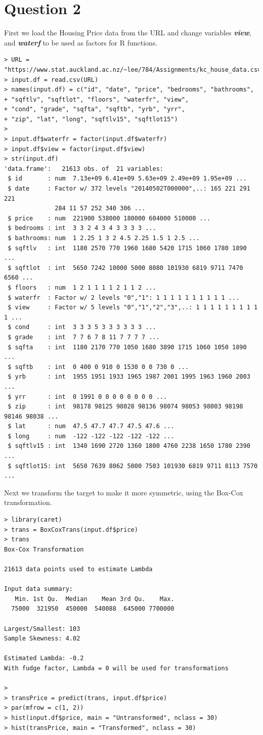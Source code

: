 \documentclass{article}%
\begin{document}
\section{Question 2}
First we load the Housing Price data from the URL and change variables \emph{\textbf{view}}, and \emph{\textbf{waterf}} to be used as factors for R functions.
\begin{verbatim}
> URL = "https://www.stat.auckland.ac.nz/~lee/784/Assignments/kc_house_data.csv"
> input.df = read.csv(URL)
> names(input.df) = c("id", "date", "price", "bedrooms", "bathrooms",
+ "sqftlv", "sqftlot", "floors", "waterfr", "view",
+ "cond", "grade", "sqfta", "sqftb", "yrb", "yrr",
+ "zip", "lat", "long", "sqftlv15", "sqftlot15")
>
> input.df$waterfr = factor(input.df$waterfr)
> input.df$view = factor(input.df$view)
> str(input.df)
'data.frame':   21613 obs. of  21 variables:
 $ id       : num  7.13e+09 6.41e+09 5.63e+09 2.49e+09 1.95e+09 ...
 $ date     : Factor w/ 372 levels "20140502T000000",..: 165 221 291 221
              284 11 57 252 340 306 ...
 $ price    : num  221900 538000 180000 604000 510000 ...
 $ bedrooms : int  3 3 2 4 3 4 3 3 3 3 ...
 $ bathrooms: num  1 2.25 1 3 2 4.5 2.25 1.5 1 2.5 ...
 $ sqftlv   : int  1180 2570 770 1960 1680 5420 1715 1060 1780 1890 ...
 $ sqftlot  : int  5650 7242 10000 5000 8080 101930 6819 9711 7470 6560 ...
 $ floors   : num  1 2 1 1 1 1 2 1 1 2 ...
 $ waterfr  : Factor w/ 2 levels "0","1": 1 1 1 1 1 1 1 1 1 1 ...
 $ view     : Factor w/ 5 levels "0","1","2","3",..: 1 1 1 1 1 1 1 1 1 1 ...
 $ cond     : int  3 3 3 5 3 3 3 3 3 3 ...
 $ grade    : int  7 7 6 7 8 11 7 7 7 7 ...
 $ sqfta    : int  1180 2170 770 1050 1680 3890 1715 1060 1050 1890 ...
 $ sqftb    : int  0 400 0 910 0 1530 0 0 730 0 ...
 $ yrb      : int  1955 1951 1933 1965 1987 2001 1995 1963 1960 2003 ...
 $ yrr      : int  0 1991 0 0 0 0 0 0 0 0 ...
 $ zip      : int  98178 98125 98028 98136 98074 98053 98003 98198 98146 98038 ...
 $ lat      : num  47.5 47.7 47.7 47.5 47.6 ...
 $ long     : num  -122 -122 -122 -122 -122 ...
 $ sqftlv15 : int  1340 1690 2720 1360 1800 4760 2238 1650 1780 2390 ...
 $ sqftlot15: int  5650 7639 8062 5000 7503 101930 6819 9711 8113 7570 ...
\end{verbatim}
Next we transform the target to make it more symmetric, using the Box-Cox transformation.
\begin{verbatim}
> library(caret)
> trans = BoxCoxTrans(input.df$price)
> trans
Box-Cox Transformation

21613 data points used to estimate Lambda

Input data summary:
   Min. 1st Qu.  Median    Mean 3rd Qu.    Max.
  75000  321950  450000  540088  645000 7700000

Largest/Smallest: 103
Sample Skewness: 4.02

Estimated Lambda: -0.2
With fudge factor, Lambda = 0 will be used for transformations

>
> transPrice = predict(trans, input.df$price)
> par(mfrow = c(1, 2))
> hist(input.df$price, main = "Untransformed", nclass = 30)
> hist(transPrice, main = "Transformed", nclass = 30)
\end{verbatim}
\end{document}
